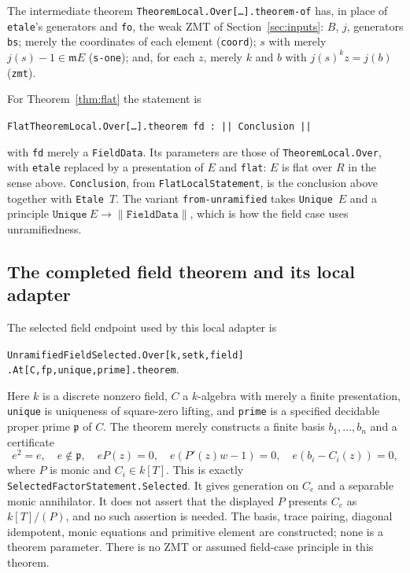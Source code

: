 \documentclass[11pt]{amsart}
\numberwithin{equation}{section}
\theoremstyle{definition}
\theoremstyle{remark}
\newcommand{\m}{\mathfrak m}
\newcommand{\code}[1]{\texttt{#1}}
\begin{document}
The intermediate theorem
\code{TheoremLocal.Over[\ldots].theorem-of} has, in place of
\code{etale}'s generators and \code{fo}, the weak ZMT of
Section~\ref{sec:inputs}: $B$, $j$, generators \code{bs}; merely the
coordinates of each element (\code{coord}); $s$ with merely
$j(s)-1\in\m E$ (\code{s-one}); and, for each $z$, merely $k$ and $b$
with $j(s)^kz=j(b)$ (\code{zmt}).

For Theorem~\ref{thm:flat} the statement is
\begin{center}
\code{FlatTheoremLocal.Over[\ldots].theorem fd : || Conclusion ||}
\end{center}
with \code{fd} merely a \code{FieldData}. Its parameters are those of
\code{TheoremLocal.Over}, with \code{etale} replaced by a presentation
of $E$ and \code{flat}: $E$ is flat over $R$ in the sense above.
\code{Conclusion}, from \code{FlatLocalStatement}, is the conclusion
above together with \code{Etale}~$T$. The variant
\code{from-unramified} takes \code{Unique}~$E$ and a principle
$\code{Unique}\ E\to\|\code{FieldData}\|$, which is how the field case
uses unramifiedness.

\subsection{The completed field theorem and its local adapter}
\label{sec:field-checked}

The selected field endpoint used by this local adapter is
\begin{center}
\code{UnramifiedFieldSelected.Over[k,setk,field]}\\
\code{.At[C,fp,unique,prime].theorem}.
\end{center}
Here $k$ is a discrete nonzero field, $C$ a $k$-algebra with merely a
finite presentation, \code{unique} is uniqueness of square-zero
lifting, and \code{prime} is a specified decidable proper prime
$\mathfrak p$ of $C$. The theorem merely constructs a finite basis
$b_1,\ldots,b_n$ and a certificate
\[
 e^2=e,\quad e\notin\mathfrak p,\quad
 eP(z)=0,\quad e(P'(z)w-1)=0,\quad
 e(b_i-C_i(z))=0,
\]
where $P$ is monic and $C_i\in k[T]$. This is exactly
\code{SelectedFactorStatement.Selected}. It gives generation on $C_e$
and a separable monic annihilator. It does not assert that the displayed
$P$ presents $C_e$ as $k[T]/(P)$, and no such assertion is needed.
The basis, trace pairing, diagonal idempotent, monic equations and
primitive element are constructed; none is a theorem parameter. There
is no ZMT or assumed field-case principle in this theorem.
\end{document}
